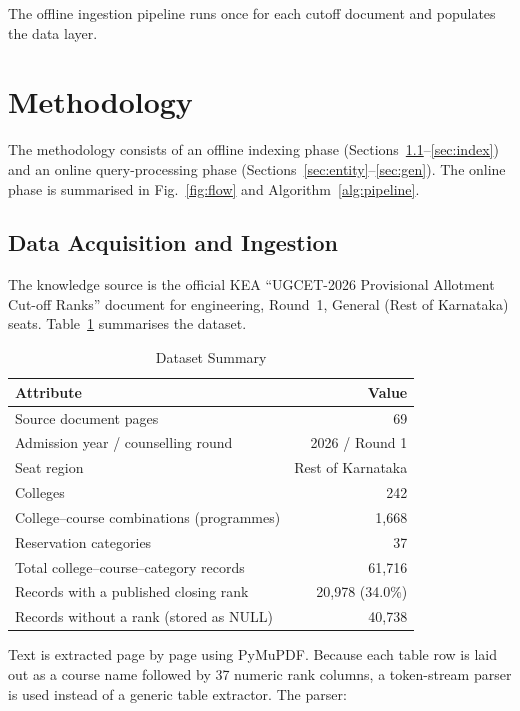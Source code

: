 \documentclass[conference]{IEEEtran}
\begin{document}
The offline ingestion pipeline runs once for each cutoff
document and populates the data layer.

\section{Methodology}

The methodology consists of an offline indexing phase
(Sections~\ref{sec:ingest}--\ref{sec:index}) and an online
query-processing phase (Sections~\ref{sec:entity}--\ref{sec:gen}).
The online phase is summarised in Fig.~\ref{fig:flow} and
Algorithm~\ref{alg:pipeline}.

\subsection{Data Acquisition and Ingestion}
\label{sec:ingest}

The knowledge source is the official KEA ``UGCET-2026
Provisional Allotment Cut-off Ranks'' document for engineering,
Round~1, General (Rest of Karnataka) seats. Table~\ref{tab:dataset}
summarises the dataset.

\begin{table}[!t]
\centering
\caption{Dataset Summary}
\label{tab:dataset}
\footnotesize
\renewcommand{\arraystretch}{1.1}
\begin{tabular}{@{}lr@{}}
\toprule
\textbf{Attribute} & \textbf{Value} \\
\midrule
Source document pages & 69 \\
Admission year / counselling round & 2026 / Round 1 \\
Seat region & Rest of Karnataka \\
Colleges & 242 \\
College--course combinations (programmes) & 1,668 \\
Reservation categories & 37 \\
Total college--course--category records & 61,716 \\
Records with a published closing rank & 20,978 (34.0\%) \\
Records without a rank (stored as NULL) & 40,738 \\
\bottomrule
\end{tabular}
\end{table}

Text is extracted page by page using PyMuPDF. Because each
table row is laid out as a course name followed by 37 numeric
rank columns, a token-stream parser is used instead of a
generic table extractor. The parser:
\end{document}
